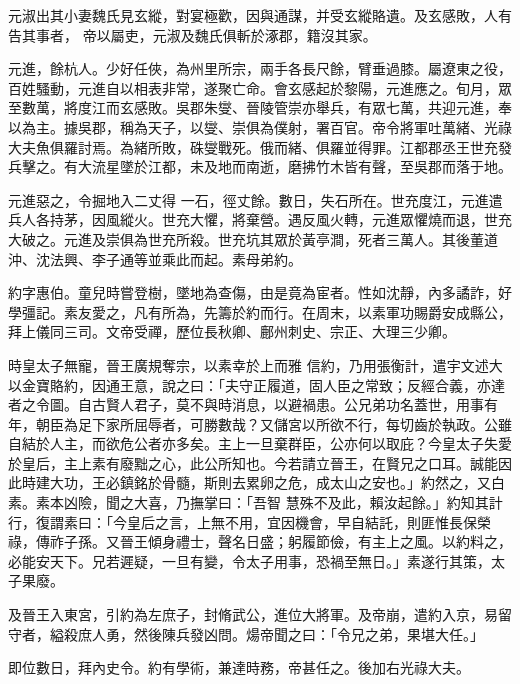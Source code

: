\begin{pinyinscope}
 元淑出其小妻魏氏見玄縱，對宴極歡，因與通謀，并受玄縱賂遺。及玄感敗，人有告其事者，
 帝以屬吏，元淑及魏氏俱斬於涿郡，籍沒其家。



 元進，餘杭人。少好任俠，為州里所宗，兩手各長尺餘，臂垂過膝。屬遼東之役，百姓騷動，元進自以相表非常，遂聚亡命。會玄感起於黎陽，元進應之。旬月，眾至數萬，將度江而玄感敗。吳郡朱燮、晉陵管崇亦舉兵，有眾七萬，共迎元進，奉以為主。據吳郡，稱為天子，以燮、崇俱為僕射，署百官。帝令將軍吐萬緒、光祿大夫魚俱羅討焉。為緒所敗，硃燮戰死。俄而緒、俱羅並得罪。江都郡丞王世充發兵擊之。有大流星墜於江都，未及地而南逝，磨拂竹木皆有聲，至吳郡而落于地。



 元進惡之，令掘地入二丈得
 一石，徑丈餘。數日，失石所在。世充度江，元進遣兵人各持茅，因風縱火。世充大懼，將棄營。遇反風火轉，元進眾懼燒而退，世充大破之。元進及崇俱為世充所殺。世充坑其眾於黃亭澗，死者三萬人。其後董道沖、沈法興、李子通等並乘此而起。素母弟約。



 約字惠伯。童兒時嘗登樹，墜地為查傷，由是竟為宦者。性如沈靜，內多譎詐，好學彊記。素友愛之，凡有所為，先籌於約而行。在周末，以素軍功賜爵安成縣公，拜上儀同三司。文帝受禪，歷位長秋卿、鄜州刺史、宗正、大理三少卿。



 時皇太子無寵，晉王廣規奪宗，以素幸於上而雅
 信約，乃用張衡計，遣宇文述大以金寶賂約，因通王意，說之曰：「夫守正履道，固人臣之常致；反經合義，亦達者之令圖。自古賢人君子，莫不與時消息，以避禍患。公兄弟功名蓋世，用事有年，朝臣為足下家所屈辱者，可勝數哉？又儲宮以所欲不行，每切齒於執政。公雖自結於人主，而欲危公者亦多矣。主上一旦棄群臣，公亦何以取庇？今皇太子失愛於皇后，主上素有廢黜之心，此公所知也。今若請立晉王，在賢兄之口耳。誠能因此時建大功，王必鎮銘於骨髓，斯則去累卵之危，成太山之安也。」約然之，又白素。素本凶險，聞之大喜，乃撫掌曰：「吾智
 慧殊不及此，賴汝起餘。」約知其計行，復謂素曰：「今皇后之言，上無不用，宜因機會，早自結託，則匪惟長保榮祿，傳祚子孫。又晉王傾身禮士，聲名日盛；躬履節儉，有主上之風。以約料之，必能安天下。兄若遲疑，一旦有變，令太子用事，恐禍至無日。」素遂行其策，太子果廢。



 及晉王入東宮，引約為左庶子，封脩武公，進位大將軍。及帝崩，遣約入京，易留守者，縊殺庶人勇，然後陳兵發凶問。煬帝聞之曰：「令兄之弟，果堪大任。」



 即位數日，拜內史令。約有學術，兼達時務，帝甚任之。後加右光祿大夫。




\end{pinyinscope}

